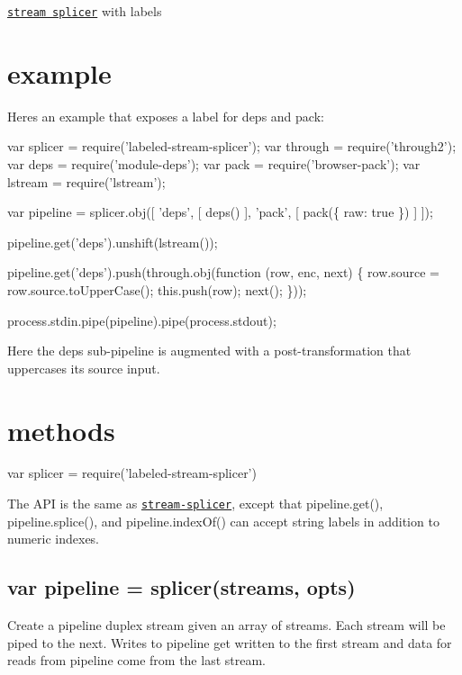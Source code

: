 \href{https://npmjs.org/package/stream-splicer}{\tt stream splicer} with labels

\href{http://travis-ci.org/browserify/labeled-stream-splicer}{\tt }

\section*{example}

Here\textquotesingle{}s an example that exposes a label for {\ttfamily deps} and {\ttfamily pack}\+:


\begin{DoxyCode}
var splicer = require('labeled-stream-splicer');
var through = require('through2');
var deps = require('module-deps');
var pack = require('browser-pack');
var lstream = require('lstream');

var pipeline = splicer.obj([
    'deps', [ deps() ],
    'pack', [ pack(\{ raw: true \}) ]
]);

pipeline.get('deps').unshift(lstream());

pipeline.get('deps').push(through.obj(function (row, enc, next) \{
    row.source = row.source.toUpperCase();
    this.push(row);
    next();
\}));

process.stdin.pipe(pipeline).pipe(process.stdout);
\end{DoxyCode}


Here the {\ttfamily deps} sub-\/pipeline is augmented with a post-\/transformation that uppercases its source input.

\section*{methods}


\begin{DoxyCode}
var splicer = require('labeled-stream-splicer')
\end{DoxyCode}


The A\+PI is the same as \href{https://npmjs.org/package/stream-splicer}{\tt stream-\/splicer}, except that {\ttfamily pipeline.\+get()}, {\ttfamily pipeline.\+splice()}, and {\ttfamily pipeline.\+index\+Of()} can accept string labels in addition to numeric indexes.

\subsection*{var pipeline = splicer(streams, opts)}

Create a {\ttfamily pipeline} duplex stream given an array of {\ttfamily streams}. Each {\ttfamily stream} will be piped to the next. Writes to {\ttfamily pipeline} get written to the first stream and data for reads from {\ttfamily pipeline} come from the last stream.

